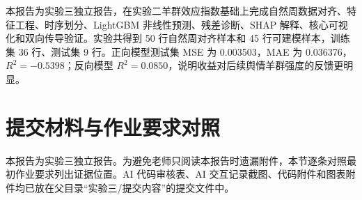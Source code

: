\documentclass[UTF8,a4paper,12pt]{ctexart}
\author{丁致宇}
\date{2026年6月}
\begin{document}
\maketitle

\begin{ustcabstract}
本报告为实验三独立报告，在实验二羊群效应指数基础上完成自然周数据对齐、特征工程、时序划分、LightGBM 非线性预测、残差诊断、SHAP 解释、核心可视化和双向传导验证。实验共得到 50 行自然周对齐样本和 45 行可建模样本，训练集 36 行、测试集 9 行。正向模型测试集 MSE 为 0.003503，MAE 为 0.036376，\(R^2=-0.5398\)；反向模型 \(R^2=0.0850\)，说明收益对后续舆情羊群强度的反馈更明显。
\end{ustcabstract}


\clearpage
\tableofcontents
\clearpage


\section{提交材料与作业要求对照}

本报告为实验三独立报告。为避免老师只阅读本报告时遗漏附件，本节逐条对照最初作业要求列出证据位置。AI 代码审核表、AI 交互记录截图、代码附件和图表附件均已放在父目录“实验三/提交内容”的提交文件中。
\end{document}
